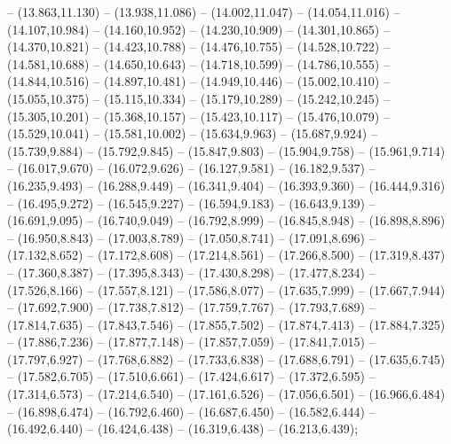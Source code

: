 -- (13.863,11.130) -- (13.938,11.086) -- (14.002,11.047) -- (14.054,11.016) -- (14.107,10.984) -- (14.160,10.952) -- (14.230,10.909) -- (14.301,10.865) -- (14.370,10.821) -- (14.423,10.788) -- (14.476,10.755) -- (14.528,10.722) -- (14.581,10.688) -- (14.650,10.643) -- (14.718,10.599) -- (14.786,10.555) -- (14.844,10.516) -- (14.897,10.481) -- (14.949,10.446) -- (15.002,10.410) -- (15.055,10.375) -- (15.115,10.334) -- (15.179,10.289) -- (15.242,10.245) -- (15.305,10.201) -- (15.368,10.157) -- (15.423,10.117) -- (15.476,10.079) -- (15.529,10.041) -- (15.581,10.002) -- (15.634,9.963) -- (15.687,9.924) -- (15.739,9.884) -- (15.792,9.845) -- (15.847,9.803) -- (15.904,9.758) -- (15.961,9.714) -- (16.017,9.670) -- (16.072,9.626) -- (16.127,9.581) -- (16.182,9.537) -- (16.235,9.493) -- (16.288,9.449) -- (16.341,9.404) -- (16.393,9.360) -- (16.444,9.316) -- (16.495,9.272) -- (16.545,9.227) -- (16.594,9.183) -- (16.643,9.139) -- (16.691,9.095) -- (16.740,9.049) -- (16.792,8.999) -- (16.845,8.948) -- (16.898,8.896) -- (16.950,8.843) -- (17.003,8.789) -- (17.050,8.741) -- (17.091,8.696) -- (17.132,8.652) -- (17.172,8.608) -- (17.214,8.561) -- (17.266,8.500) -- (17.319,8.437) -- (17.360,8.387) -- (17.395,8.343) -- (17.430,8.298) -- (17.477,8.234) -- (17.526,8.166) -- (17.557,8.121) -- (17.586,8.077) -- (17.635,7.999) -- (17.667,7.944) -- (17.692,7.900) -- (17.738,7.812) -- (17.759,7.767) -- (17.793,7.689) -- (17.814,7.635) -- (17.843,7.546) -- (17.855,7.502) -- (17.874,7.413) -- (17.884,7.325) -- (17.886,7.236) -- (17.877,7.148) -- (17.857,7.059) -- (17.841,7.015) -- (17.797,6.927) -- (17.768,6.882) -- (17.733,6.838) -- (17.688,6.791) -- (17.635,6.745) -- (17.582,6.705) -- (17.510,6.661) -- (17.424,6.617) -- (17.372,6.595) -- (17.314,6.573) -- (17.214,6.540) -- (17.161,6.526) -- (17.056,6.501) -- (16.966,6.484) -- (16.898,6.474) -- (16.792,6.460) -- (16.687,6.450) -- (16.582,6.444) -- (16.492,6.440) -- (16.424,6.438) -- (16.319,6.438) -- (16.213,6.439);
